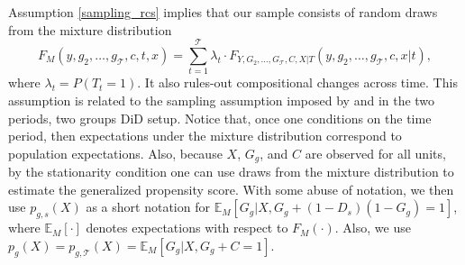 \documentclass[11pt]{article}%
\theoremstyle{plain}
\numberwithin{sassumption}{section}
\numberwithin{equation}{section}
\begin{document}
{\small Assumption \ref{sampling_rcs} implies that our sample consists of
random draws from the mixture distribution
\[
F_{M}(y,g_{2},\ldots,g_{\mathcal{T}},c,t,x)=\sum_{t=1}^{\mathcal{T}}%
\lambda_{t}\cdot F_{Y,G_{2},\ldots,G_{\mathcal{T}},C,X|T}(y,g_{2}%
,\ldots,g_{\mathcal{T}},c,x|t),
\]
where $\lambda_{t}=P(T_{t}=1)$. It also rules-out compositional changes across
time. This assumption is related to the sampling assumption imposed by
\cite{Abadie2005} and \cite{SantAnna2020} in the two periods, two groups DiD 
setup. Notice that, once one conditions on the time period, then expectations
under the mixture distribution correspond to population expectations. Also,
because $X$, $G_{g}$, and $C$ are observed for all units, by the stationarity
condition one can use draws from the mixture distribution to estimate the
generalized propensity score. With some abuse of notation, we then use
$p_{g,s}\left(  X\right)  $ as a short notation for $\mathbb{E}_{M}\left[
G_{g}|X,G_{g}+\left(  1-D_{s}\right)  \left(  1-G_{g}\right)  =1\right]  $,
where $\mathbb{E}_{M}\left[  \cdot\right]  $ denotes expectations with respect
to $F_{M}\left(  \cdot\right)  $. Also, we use $p_{g}(X)=p_{g,\mathcal{T}%
}(X)=\mathbb{E}_{M}\left[  G_{g}|X,G_{g}+C=1\right]  $. }
\end{document}
